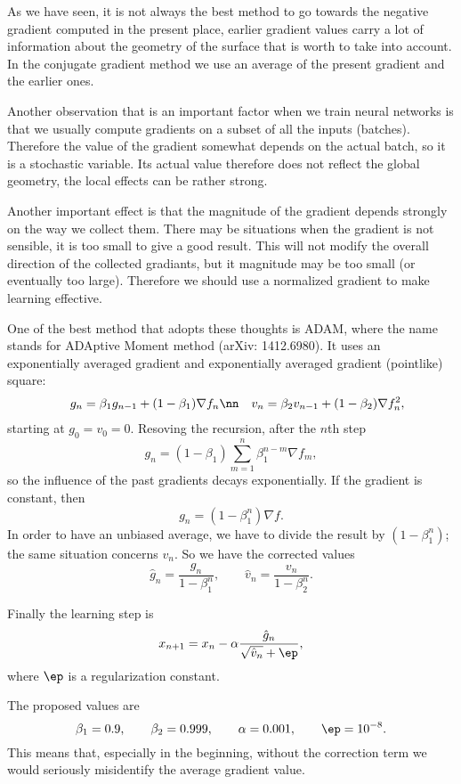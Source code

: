 \documentclass[10pt,a4paper]{article}
\begin{document}
As we have seen, it is not always the best method to go towards the negative gradient computed in the present place, earlier gradient values carry a lot of information about the geometry of the surface that is worth to take into account. In the conjugate gradient method we use an average of the present gradient and the earlier ones.

Another observation that is an important factor when we train neural networks is that we usually compute gradients on a subset of all the inputs (batches). Therefore the value of the gradient somewhat depends on the actual batch, so it is a stochastic variable. Its actual value therefore does not reflect the global geometry, the local effects can be rather strong.

Another important effect is that the magnitude of the gradient depends strongly on the way we collect them. There may be situations when the gradient is not sensible, it is too small to give a good result. This will not modify the overall direction of the collected gradiants, but it magnitude may be too small (or eventually too large). Therefore we should use a normalized gradient to make learning effective.

One of the best method that adopts these thoughts is ADAM, where the name stands for ADAptive Moment method (arXiv: 1412.6980). It uses an exponentially averaged gradient and exponentially averaged gradient (pointlike) square:
\begin{eqnarray}
  && g_n = \beta_1 g_{n-1} + (1-\beta_1) \nabla f_n\nn
  && v_n = \beta_2 v_{n-1} + (1-\beta_2) \nabla f_n^2,
\end{eqnarray}
starting at $g_0=v_0=0$. Resoving the recursion, after the $n$th step
\begin{equation}
  g_n = (1-\beta_1)\sum_{m=1}^n \beta_1^{n-m} \nabla f_m,
\end{equation}
so the influence of the past gradients decays exponentially. If the gradient is constant, then
\begin{equation}
  g_n = (1-\beta_1^n) \nabla f.
\end{equation}
In order to have an unbiased average, we have to divide the result by $(1-\beta_1^n)$; the same situation concerns $v_n$. So we have the corrected values
\begin{equation}
  \hat g_n = \frac{g_n}{1-\beta_1^n},\qquad
  \hat v_n = \frac{v_n}{1-\beta_2^n}.
\end{equation}


Finally the learning step is
\begin{equation}
  x_{n+1} = x_n - \alpha \frac{\hat g_n}{\sqrt{\hat v_n}+\ep},
\end{equation}
where $\ep$ is a regularization constant.

The proposed values are
\begin{equation}
  \beta_1 = 0.9,\qquad \beta_2=0.999,\qquad \alpha=0.001,\qquad \ep=10^{-8}.
\end{equation}
This means that, especially in the beginning, without the correction term we would seriously misidentify the average gradient value.
\end{document}
